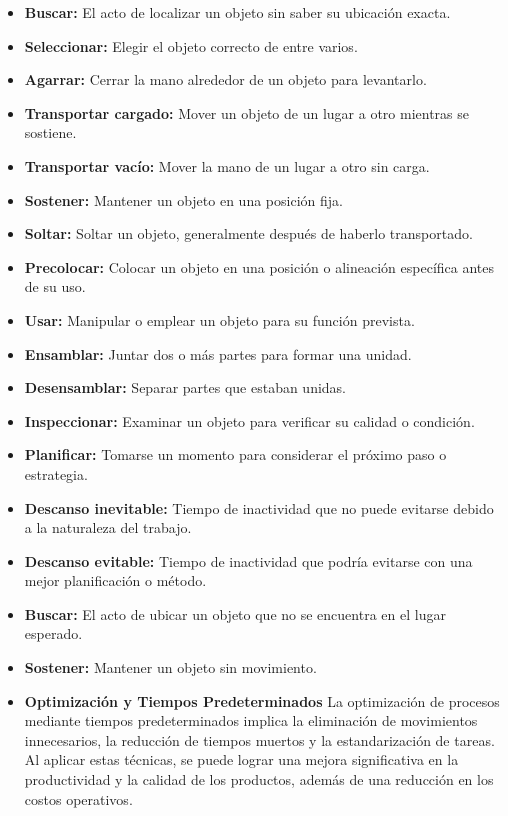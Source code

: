 \begin{itemize}
    \item \textbf{Buscar:} El acto de localizar un objeto sin saber su ubicación exacta.
    \item \textbf{Seleccionar:} Elegir el objeto correcto de entre varios.
    \item \textbf{Agarrar:} Cerrar la mano alrededor de un objeto para levantarlo.
    \item \textbf{Transportar cargado:} Mover un objeto de un lugar a otro mientras se sostiene.
    \item \textbf{Transportar vacío:} Mover la mano de un lugar a otro sin carga.
    \item \textbf{Sostener:} Mantener un objeto en una posición fija.
    \item \textbf{Soltar: }Soltar un objeto, generalmente después de haberlo transportado.
    \item \textbf{Precolocar:} Colocar un objeto en una posición o alineación específica antes de su uso.
    \item \textbf{Usar:} Manipular o emplear un objeto para su función prevista.
    \item \textbf{Ensamblar: }Juntar dos o más partes para formar una unidad.
    \item \textbf{Desensamblar:} Separar partes que estaban unidas.
    \item \textbf{Inspeccionar: }Examinar un objeto para verificar su calidad o condición.
    \item \textbf{Planificar: }Tomarse un momento para considerar el próximo paso o estrategia.
    \item \textbf{Descanso inevitable: }Tiempo de inactividad que no puede evitarse debido a la naturaleza del trabajo.
    \item \textbf{Descanso evitable:} Tiempo de inactividad que podría evitarse con una mejor planificación o método.
    \item \textbf{Buscar:} El acto de ubicar un objeto que no se encuentra en el lugar esperado.
    \item \textbf{Sostener: }Mantener un objeto sin movimiento.\cite{Niebel}
    
    \item \textbf{Optimización y Tiempos Predeterminados}
    La optimización de procesos mediante tiempos predeterminados implica la eliminación de movimientos innecesarios, la reducción de tiempos muertos y la estandarización de tareas. Al aplicar estas técnicas, se puede lograr una mejora significativa en la productividad y la calidad de los productos, además de una reducción en los costos operativos.\cite{karube}
    

\end{itemize}

